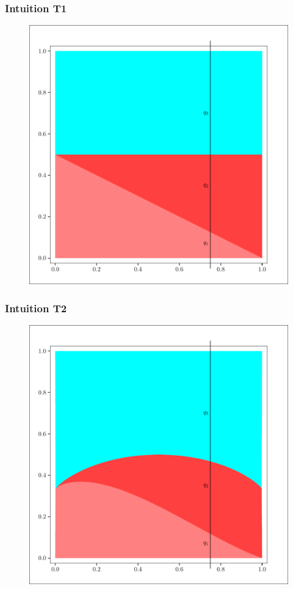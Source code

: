 \documentclass[xcolor=dvipsnames]{beamer}
\begin{document}
\begin{frame}
  \frametitle{Intuition T1}
\begin{figure}[h]
\includegraphics[scale=.4]{../diagrams/zeroone-unif.pdf}
\end{figure}
\end{frame}

\begin{frame}
  \frametitle{Intuition T2}
\begin{figure}[h]
\includegraphics[scale=.4]{../diagrams/zeroone-mxnt.pdf}
\end{figure}
\end{frame}
\end{document}

